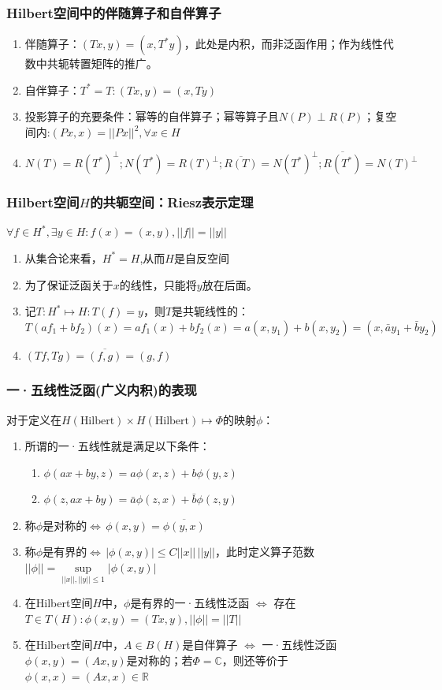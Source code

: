 \documentclass[a4paper, 12pt]{ctexart}
\begin{document}
\subsubsection{Hilbert空间中的伴随算子和自伴算子}
\begin{enumerate}
    \item 伴随算子：$(Tx,y)=(x,T^*y)$，此处是内积，而非泛函作用；作为线性代数中共轭转置矩阵的推广。
    \item 自伴算子：$T^*=T:(Tx,y)=(x,Ty)$
    \item 投影算子的充要条件：幂等的自伴算子；幂等算子且$N(P)\perp R(P)$；复空间内:$(Px,x)=||Px||^2,\forall x\in H$
    \item $N(T)=R(T^*)^{\perp};N(T^*)=R(T)^{\perp};\overline{R(T)}=N(T^*)^{\perp};\overline{R(T^*)}=N(T)^{\perp}$
\end{enumerate}
\subsubsection{Hilbert空间$H$的共轭空间：Riesz表示定理}
$\forall f\in H^*,\exists y\in H:f(x)=(x,y),||f||=||y||$
\begin{enumerate}
    \item 从集合论来看，$H^*=H$,从而$H$是自反空间
    \item 为了保证泛函关于$x$的线性，只能将$y$放在后面。
    \item 记$T:H^*\mapsto H:T(f)=y$，则$T$是共轭线性的：\\ $T(af_1+bf_2)(x)=af_1(x)+bf_2(x)=a(x,y_1)+b(x,y_2)=(x,\bar{a}y_1+\bar{b}y_2)$
    \item $(Tf,Tg)=\overline{(f,g)}=(g,f)$
\end{enumerate}
\subsubsection{一·五线性泛函(广义内积)的表现}
对于定义在$H(\text{Hilbert})\times H(\text{Hilbert})\mapsto \Phi$的映射$\phi$：
\begin{enumerate}
    \item 所谓的一·五线性就是满足以下条件：
    \begin{enumerate}
        \item $\phi(ax+by,z)=a\phi(x,z)+b\phi(y,z)$
        \item $\phi(z,ax+by)=\bar{a}\phi(z,x)+\bar{b}\phi(z,y)$    
    \end{enumerate}
    \item 称$\phi$是对称的$\iff \, \phi(x,y)=\overline{\phi(y,x)}$
    \item 称$\phi$是有界的$\iff \, |\phi(x,y)|\leq C||x|| \, ||y||$，此时定义算子范数$||\phi||=\underset{||x||,||y||\leq 1}{\sup}|\phi(x,y)|$
    \item 在Hilbert空间$H$中，$\phi$是有界的一·五线性泛函 $\iff$ 存在$T\in T(H):\phi(x,y)=(Tx,y),||\phi||=||T||$
    \item 在Hilbert空间$H$中，$A\in B(H)$是自伴算子 $\iff$ 一·五线性泛函$\phi(x,y)=(Ax,y)$是对称的；若$\Phi=\mathbb{C}$，则还等价于$\phi(x,x)=(Ax,x)\in \mathbb{R}$
\end{enumerate}
\end{document}
